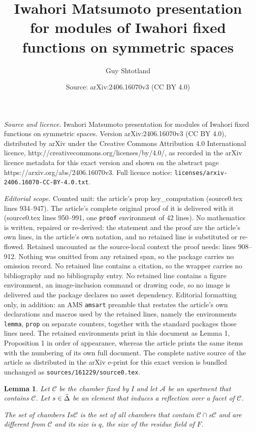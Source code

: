 \documentclass[10pt,a4paper]{amsart}
\title{Iwahori Matsumoto presentation for modules of Iwahori fixed functions on symmetric spaces}
\author{Guy Shtotland}
\date{Source: arXiv:2406.16070v3 (CC BY 4.0)}
\newtheorem{lemma}{Lemma}
\newcommand{\A}{\mathcal{A}}
\newcommand{\C}{\mathcal{C}}
\begin{document}
\maketitle

\noindent\emph{Source and licence.} Iwahori Matsumoto presentation for modules of Iwahori fixed functions on symmetric spaces. Version arXiv:2406.16070v3 (CC BY 4.0), distributed by arXiv under the Creative Commons Attribution 4.0 International licence, http://creativecommons.org/licenses/by/4.0/, as recorded in the arXiv licence metadata for this exact version and shown on the abstract page https://arxiv.org/abs/2406.16070v3. Full licence notice: \texttt{licenses/arxiv-2406.16070-CC-BY-4.0.txt}.\par\smallskip

\noindent\textit{Editorial scope.} Counted unit: the article's prop key\_computation (source0.tex lines 934--947). The article's complete original proof of it is delivered with it (source0.tex lines 950--991, one \texttt{proof} environment of 42 lines). No mathematics is written, repaired or re-derived: the statement and the proof are the article's own lines, in the article's own notation, and no retained line is substituted or re-flowed.  Retained uncounted as the source-local context the proof needs: lines 908--912.  Nothing was omitted from any retained span, so the package carries no omission record.  No retained line contains a citation, so the wrapper carries no bibliography and no bibliography entry.  No retained line contains a figure environment, an image-inclusion command or drawing code, so no image is delivered and the package declares no asset dependency.  Editorial formatting only, in addition: an AMS \texttt{amsart} preamble that restates the article's own declarations and macros used by the retained lines, namely the environments \texttt{lemma}, \texttt{prop} on separate counters, together with the standard packages those lines need.  The retained environments print in this document as Lemma 1, Proposition 1 in order of appearance, whereas the article prints the same items with the numbering of its own full document.  The complete native source of the article as distributed in the arXiv e-print for this exact version is bundled unchanged as \texttt{sources/161229/source0.tex}.
\begin{lemma}\label{3.13}
Let $\C$ be the chamber fixed by $I$ and let $\A$ be an apartment that contains $\C$. Let $s\in \Tilde{\Delta}$ be an element that induces a reflection over a facet of $\C$. 

The set of chambers $Is\C$ is the set of all chambers that contain $\C\cap s\C$ and are different from $\C$ and its size is $q$, the size of the residue field of $F$.  
\end{lemma}
\end{document}
